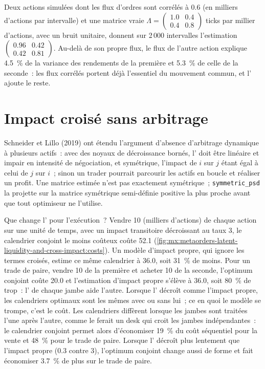 Deux actions simulées dont les flux d'ordres sont corrélés à 0.6 (en milliers d'actions par intervalle) et une matrice vraie $\Lambda=\begin{pmatrix}1.0&0.4\\0.4&0.8\end{pmatrix}$
ticks par millier d'actions, avec un bruit unitaire, donnent sur 2\,000 intervalles l'estimation $\begin{pmatrix}0.96&0.42\\0.42&0.81\end{pmatrix}$. Au-delà de son propre flux,
le flux de l'autre action explique 4.5~\% de la variance des rendements de la première et 5.3~\% de celle de la seconde~: les flux corrélés portent déjà l'essentiel du
mouvement commun, et l' ajoute le reste.

\section{Impact croisé sans arbitrage}

Schneider et Lillo (2019) ont étendu l'argument d'absence d'arbitrage dynamique à plusieurs actifs~: avec des noyaux de décroissance bornés, l' doit être linéaire et impair en
intensité de négociation, et symétrique, l'impact de $i$ sur $j$ étant égal à celui de $j$ sur $i$~; sinon un trader pourrait parcourir les actifs en boucle et réaliser un profit.
Une matrice estimée n'est pas exactement symétrique~; \texttt{symmetric\_psd} la projette sur la matrice symétrique semi-définie positive la plus proche avant que
tout optimiseur ne l'utilise.

Que change l' pour l'exécution~? Vendre 10 (milliers d'actions) de chaque action sur une unité de temps, avec un impact transitoire décroissant au taux 3,
le calendrier conjoint le moins coûteux coûte 52.1 (\cref{fig:mx:metaorders-latent-liquidity-and-cross-impact:costs}). Un modèle d'impact propre, qui ignore les
termes croisés, estime ce même calendrier à 36.0, soit 31~\% de moins. Pour un trade de paire, vendre 10 de la première et acheter 10 de la seconde, l'optimum conjoint coûte
20.0 et l'estimation d'impact propre s'élève à 36.0, soit 80~\% de trop~: l' de chaque jambe aide l'autre. Lorsque l' décroît comme l'impact propre, les
calendriers optimaux sont les mêmes avec ou sans lui~; ce en quoi le modèle se trompe, c'est le coût. Les calendriers diffèrent lorsque les jambes sont traitées l'une après l'autre, comme
le ferait un desk qui croit les jambes indépendantes~: le calendrier conjoint permet alors d'économiser 19~\% du coût séquentiel pour la vente et 48~\% pour le trade de paire. Lorsque
l' décroît plus lentement que l'impact propre (0.3 contre 3), l'optimum conjoint change aussi de forme et fait économiser 3.7~\% de plus sur le trade de paire.

